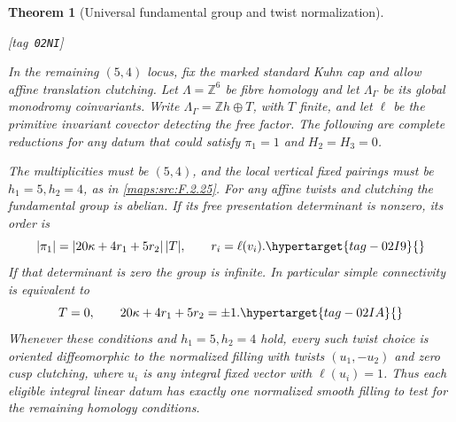 \documentclass[11pt,a4paper]{article}
\numberwithin{equation}{section}
\newtheorem{theorem}{Theorem}[section]
\theoremstyle{definition}
\newcommand{\StatementRecord}[4]{{\upshape\footnotesize[tag~\texttt{#3}]}\enspace\ignorespaces}
\begin{document}
\begin{theorem}[Universal fundamental group and twist normalization]\hypertarget{tag-02NI}{}\label{maps:src:F.2.28}
\StatementRecord{maps:src:F.2.28}{proved}{02NI}{\cref{maps:src:F.2.25}, \eqref{maps:eq:F.S5}, \eqref{maps:eq:F.T8}, \cref{maps:src:F.2.24}}


In the remaining $(5,4)$ locus, fix the marked standard Kuhn
cap and allow affine translation clutching.
Let $\Lambda=\mathbb Z^6$ be fibre homology and let
$\Lambda_\Gamma$ be its global monodromy coinvariants.
Write $\Lambda_\Gamma=\mathbb Zh\oplus T$, with $T$ finite,
and let $\ell$ be the primitive invariant covector detecting
the free factor.  The following are complete reductions for
any datum that could satisfy $\pi_1=1$ and $H_2=H_3=0$.

The multiplicities must be $(5,4)$, and the local
vertical fixed pairings must be $h_1=5,h_2=4$, as in \ref{maps:src:F.2.25}.
For any affine twists and clutching the fundamental group
is abelian.  If its free presentation determinant is nonzero,
its order is
\begin{equation}
 |\pi_1|=|20\kappa+4r_1+5r_2|\,|T|,
 \qquad r_i=\ell(v_i).
 \hypertarget{tag-02I9}{}\label{maps:eq:F.T11}
\end{equation}
If that determinant is zero the group is infinite.
In particular simple connectivity is equivalent to
\begin{equation}
 T=0,\qquad 20\kappa+4r_1+5r_2=\pm1.
 \hypertarget{tag-02IA}{}\label{maps:eq:F.T12}
\end{equation}
Whenever these conditions and $h_1=5,h_2=4$ hold, every
such twist choice is oriented diffeomorphic to the normalized
filling with twists $(u_1,-u_2)$ and zero cusp clutching,
where $u_i$ is any integral fixed vector with $\ell(u_i)=1$.
Thus each eligible integral linear datum has exactly one
normalized smooth filling to test for the remaining
homology conditions.

\end{theorem}
\end{document}

